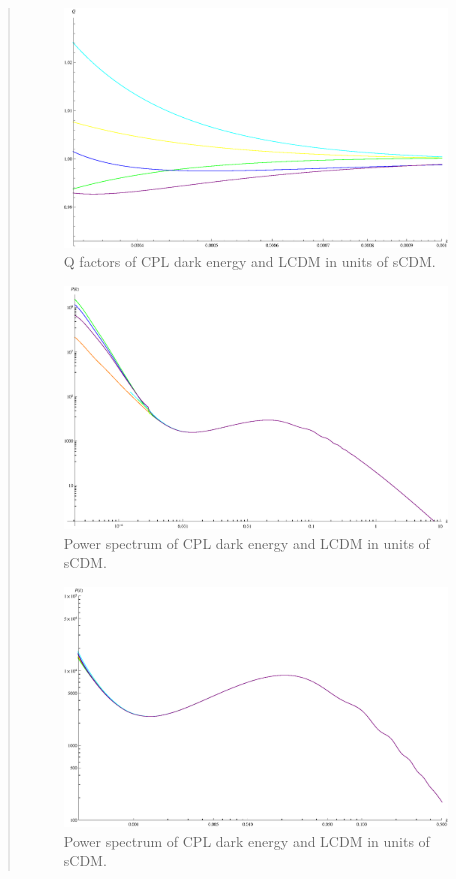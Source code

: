 \documentclass{article}
\begin{document}
\begin{quotation}
{\begin{enumerate}
\begin{figure}[!htpb]
\centering
\includegraphics[width=350pt]{CPL_Supp_QFactors_Detail.eps}
\caption{\color{blue}Q factors of CPL dark energy and LCDM in units of sCDM.}\label{fig:CPL_Supp_QFactors_Detail}
\end{figure}


\begin{figure}[!htpb]
\centering
\includegraphics[width=350pt]{CPL_Supp_PowerSpectrums.eps}
\caption{\color{blue}Power spectrum of CPL dark energy and LCDM in units of sCDM.}\label{fig:CPL_Supp_PowerSpectrums}
\end{figure}


\begin{figure}[!htpb]
\centering
\includegraphics[width=350pt]{CPL_Supp_PowerSpectrums_Cut.eps}
\caption{\color{blue}Power spectrum of CPL dark energy and LCDM in units of sCDM.}\label{fig:CPL_Supp_PowerSpectrums_Cut}
\end{figure}



\end{enumerate}}
\end{quotation}
\end{document}
